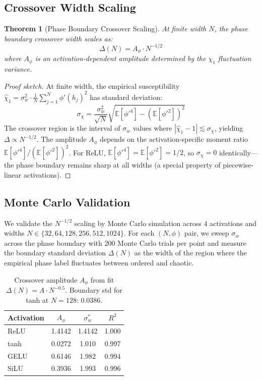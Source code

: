 \documentclass[10pt]{article}
\newcommand{\EE}{\mathbb{E}}
\newtheorem{theorem}{Theorem}
\begin{document}
\subsection{Crossover Width Scaling}

\begin{theorem}[Phase Boundary Crossover Scaling]
\label{thm:crossover}
At finite width $N$, the phase boundary crossover width scales as:
\begin{equation}
    \Delta(N) = A_\phi \cdot N^{-1/2}
    \label{eq:crossover-scaling}
\end{equation}
where $A_\phi$ is an activation-dependent amplitude determined by the $\chi_1$ fluctuation variance.
\end{theorem}

\begin{proof}[Proof sketch]
At finite width, the empirical susceptibility $\hat{\chi}_1 = \sigma_w^2 \cdot \frac{1}{N}\sum_{j=1}^N \phi'(h_j)^2$ has standard deviation:
\begin{equation}
    \sigma_\chi = \frac{\sigma_w^2}{\sqrt{N}} \sqrt{\EE[\phi'^4] - (\EE[\phi'^2])^2}
    \label{eq:chi1-std}
\end{equation}
The crossover region is the interval of $\sigma_w$ values where $|\hat{\chi}_1 - 1| \lesssim \sigma_\chi$, yielding $\Delta \propto N^{-1/2}$.
The amplitude $A_\phi$ depends on the activation-specific moment ratio $\EE[\phi'^4]/(\EE[\phi'^2])^2$.
For ReLU, $\EE[\phi'^4] = \EE[\phi'^2] = 1/2$, so $\sigma_\chi = 0$ identically---the phase boundary remains sharp at all widths (a special property of piecewise-linear activations).
\end{proof}

\subsection{Monte Carlo Validation}

We validate the $N^{-1/2}$ scaling by Monte Carlo simulation across 4 activations and widths $N \in \{32, 64, 128, 256, 512, 1024\}$.
For each $(N, \phi)$ pair, we sweep $\sigma_w$ across the phase boundary with 200 Monte Carlo trials per point and measure the boundary standard deviation $\Delta(N)$ as the width of the region where the empirical phase label fluctuates between ordered and chaotic.

\begin{table}[t]
\centering
\caption{Crossover amplitude $A_\phi$ from fit $\Delta(N) = A \cdot N^{-0.5}$.
Boundary std for tanh at $N\!=\!128$: $0.0386$.}
\label{tab:crossover}
\small
\begin{tabular}{@{}lccc@{}}
\toprule
\textbf{Activation} & $A_\phi$ & $\sigma_w^*$ & $R^2$ \\
\midrule
ReLU  & 1.4142 & 1.4142 & 1.000 \\
tanh  & 0.0272 & 1.010  & 0.997 \\
GELU  & 0.6146 & 1.982  & 0.994 \\
SiLU  & 0.3936 & 1.993  & 0.996 \\
\bottomrule
\end{tabular}
\end{table}
\end{document}
